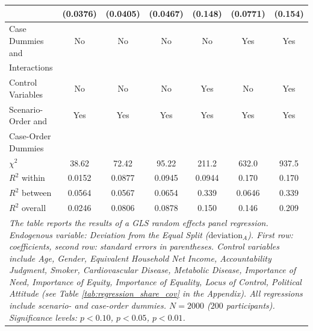 \documentclass[smallcondensed]{svjour3}
\begin{document}
\begin{landscape}
\begin{table}[ht!]
{{\begin{tabularx}{16cm}{l*{6}{c}}
                                 & (0.0376)                  &  (0.0405)                 & (0.0467)                  &  (0.148)                  &  (0.0771)                 &  (0.154)                  \\\hline
   Case Dummies and              & No                        & No                        & No                        & No                        & Yes                       & Yes                       \\
   Interactions                  &                           &                           &                           &                           &                           &                           \\
   Control Variables             & No                        & No                        & No                        & Yes                       & No                        & Yes                       \\
   Scenario-Order and            & Yes                       & Yes                       & Yes                       & Yes                       & Yes                       & Yes                       \\
   Case-Order Dummies            &                           &                           &                           &                           &                           &                           \\\hline
   $\chi^2$                      & 38.62\sym{***}            &  72.42\sym{***}           & 95.22\sym{***}            & 211.2\sym{***}            & 632.0\sym{***}            & 937.5\sym{***}            \\
   $R^2$ within                  &  0.0152                   &   0.0877                  &  0.0945                   &   0.0944                  &   0.170                   &   0.170                   \\
   $R^2$ between                 &  0.0564                   &   0.0567                  &  0.0654                   &   0.339                   &   0.0646                  &   0.339                   \\
   $R^2$ overall                 &  0.0246                   &   0.0806                  &  0.0878                   &   0.150                   &   0.146                   &   0.209                   \\\hline
\multicolumn{7}{p{15.5cm}}{\footnotesize \textit{The table reports the results of a GLS random effects panel regression. Endogenous variable: Deviation from the Equal Split ($\mbox{deviation}_A$). First row: coefficients, second row: standard errors in parentheses. Control variables include Age, Gender, Equivalent Household Net Income, Accountability Judgment, Smoker, Cardiovascular Disease, Metabolic Disease, Importance of Need, Importance of Equity, Importance of Equality, Locus of Control, Political Attitude (see Table \ref{tab:regression_share_cov} in the Appendix). All regressions include scenario- and case-order dummies. $N=2000$ ($200$ participants). Significance levels: \sym{*} \(p<0.10\), \sym{**} \(p<0.05\), \sym{***} \(p<0.01\).}}

\end{tabularx}}}
\end{table}
\end{landscape}
\end{document}
